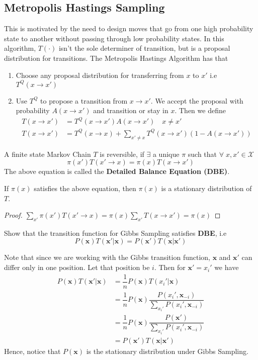 \subsection{Metropolis Hastings Sampling}
This is motivated by the need to design moves that go from one high probability state to another without passing through low probability states. In this algorithm, $T(\cdot)$ isn't the sole determiner of transition, but is a proposal distribution for transitions. The Metropolis Hastings Algorithm has that
\begin{enumerate}
	\item Choose any proposal distribution for transferring from $x$ to $x'$ i.e $T^Q(x \to x')$
	\item Use $T^Q$ to propose a transition from $x \to x'$. We accept the proposal with probability $A(x \to x')$ and transition or stay in $x$. Then we define
	\begin{align}
		T(x\to x') &= T^Q (x \to x') A(x \to x') \quad x \neq x' \\
		T(x \to x') &= T^Q (x \to x) + \sum_{x' \neq x} T^Q (x\to x') (1 - A(x \to x'))
	\end{align}
\end{enumerate}
\begin{defn}
A finite state Markov Chain $T$ is reversible, if $\exists$ a unique $\pi$ such that $\forall \; x, x' \in \mathcal X$
\begin{equation}
	\pi(x') T(x' \to x) = \pi (x) T(x \to x')
\end{equation}
The above equation is called the \textbf{Detailed Balance Equation (DBE)}.
\end{defn}
\begin{thm}
If $\pi(x)$ satisfies the above equation, then $\pi(x)$ is a stationary distribution of $T$.
\end{thm}
\begin{proof}
$\sum_{x'} \pi(x') T(x' \to x) = \pi(x) \sum_{x'} T(x \to x') = \pi (x)$
\end{proof}
\begin{quest}
Show that the transition function for Gibbs Sampling satisfies \textbf{DBE}, i.e
\[P(\mathbf x) T(\mathbf x' | \mathbf x) = P(\mathbf x') T(\mathbf x | \mathbf x')\]
\end{quest}
\begin{ans}
Note that since we are working with the Gibbs transition function, $\mathbf x$ and $\mathbf x'$ can differ only in one position. Let that position be $i$. Then for $\mathbf x' = x_i'$ we have
\begin{align*}
	P(\mathbf x) T(\mathbf x' | \mathbf x) &= \dfrac{1}{n} P(\mathbf x) T(x_i' | \mathbf x) \\ 
	&= \dfrac{1}{n} P(\mathbf x) \dfrac{P(x_i', \mathbf x_{-i})}{\sum_{x_i'}P(x_i', \mathbf x_{-i})} \\
	&= \dfrac{1}{n} P(\mathbf x)  \dfrac{P(\mathbf x')}{\sum_{x_i'}P(x_i', \mathbf x_{-i})} \\
	&= P(\mathbf x') T(\mathbf x | \mathbf x')
\end{align*}
Hence, notice that $P(\mathbf x)$ is the stationary distribution under Gibbs Sampling.
\end{ans}
